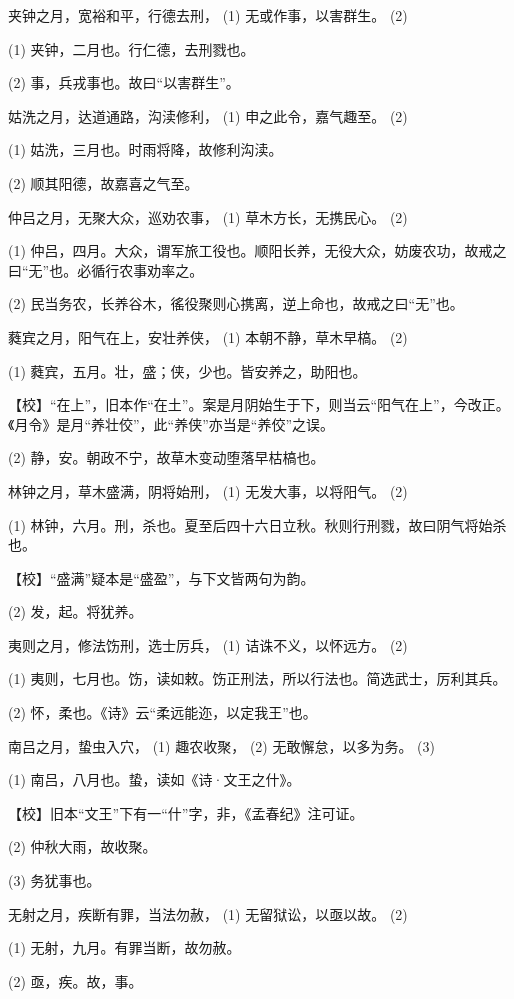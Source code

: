 \documentclass[12pt,UTF8]{ctexbook}
\begin{document}
夹钟之月，宽裕和平，行德去刑， (1) 无或作事，以害群生。 (2)

(1) 夹钟，二月也。行仁德，去刑戮也。

(2) 事，兵戎事也。故曰“以害群生”。

姑洗之月，达道通路，沟渎修利， (1) 申之此令，嘉气趣至。 (2)

(1) 姑洗，三月也。时雨将降，故修利沟渎。

(2) 顺其阳德，故嘉喜之气至。

仲吕之月，无聚大众，巡劝农事， (1) 草木方长，无携民心。 (2)

(1) 仲吕，四月。大众，谓军旅工役也。顺阳长养，无役大众，妨废农功，故戒之曰“无”也。必循行农事劝率之。

(2) 民当务农，长养谷木，徭役聚则心携离，逆上命也，故戒之曰“无”也。

蕤宾之月，阳气在上，安壮养侠， (1) 本朝不静，草木早槁。 (2)

(1) 蕤宾，五月。壮，盛；侠，少也。皆安养之，助阳也。

【校】“在上”，旧本作“在土”。案是月阴始生于下，则当云“阳气在上”，今改正。《月令》是月“养壮佼”，此“养侠”亦当是“养佼”之误。

(2) 静，安。朝政不宁，故草木变动堕落早枯槁也。

林钟之月，草木盛满，阴将始刑， (1) 无发大事，以将阳气。 (2)

(1) 林钟，六月。刑，杀也。夏至后四十六日立秋。秋则行刑戮，故曰阴气将始杀也。

【校】“盛满”疑本是“盛盈”，与下文皆两句为韵。

(2) 发，起。将犹养。

夷则之月，修法饬刑，选士厉兵， (1) 诘诛不义，以怀远方。 (2)

(1) 夷则，七月也。饬，读如敕。饬正刑法，所以行法也。简选武士，厉利其兵。

(2) 怀，柔也。《诗》云“柔远能迩，以定我王”也。

南吕之月，蛰虫入穴， (1) 趣农收聚， (2) 无敢懈怠，以多为务。 (3)

(1) 南吕，八月也。蛰，读如《诗·文王之什》。

【校】旧本“文王”下有一“什”字，非，《孟春纪》注可证。

(2) 仲秋大雨，故收聚。

(3) 务犹事也。

无射之月，疾断有罪，当法勿赦， (1) 无留狱讼，以亟以故。 (2)

(1) 无射，九月。有罪当断，故勿赦。

(2) 亟，疾。故，事。
\end{document}
